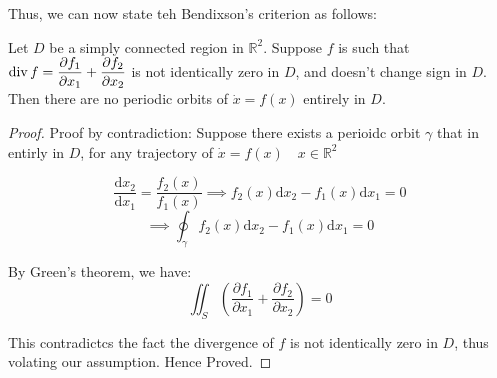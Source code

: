 Thus, we can now state teh Bendixson's criterion as follows:
\begin{theorem}
    Let \(D\) be a simply connected region in \(\mathbb{R}^2\). Suppose 
    \(f\) is such that \(\operatorname{div} f = \dfrac{\partial f_1}{\partial x_1} + \dfrac{\partial f_2}
    {\partial x_2}\) is not identically zero in \(D\), and doesn't change sign in \(D\).
    Then there are no periodic orbits of \(\dot{x} = f(x)\) entirely in \(D\).
\end{theorem}
\begin{proof}
    Proof by contradiction: Suppose there exists a perioidc orbit \(\gamma \) that in 
    entirly in \(D\), for any trajectory of \(\dot{x} = f(x) \quad x \in \mathbb{R} ^{2} \)
    
    \[
        \frac{\mathrm{d}x_2}{\mathrm{d}x_1} = \frac{f_2 (x)}{f_1 (x)} \implies 
         f_2 (x) \mathrm{d}x_2 - f_1 (x) \mathrm{d}x_1 = 0
    \]
    \[
        \implies \oint_{\gamma} f_2 (x) \mathrm{d}x_2 - f_1 (x) \mathrm{d}x_1 = 0
    \]

    By Green's theorem, we have:
    \[
        \iint_S \left( 
            \frac{\partial f_1}{\partial x_1} + \frac{\partial f_2}{\partial x_2}
         \right) = 0
    \]

    This contradictcs the fact the divergence of \(f\) is not identically zero in \(D\), thus
    volating our assumption. Hence Proved.
\end{proof}

